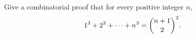 Give a combinatorial proof that for every positive integer $n$,
\[
1^3+2^3+\cdots+n^3=\dbinom{n+1}{2}^2 .
\]
